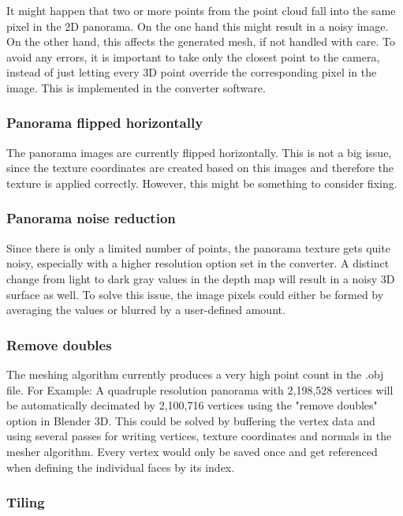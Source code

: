 It might happen that two or more points from the point cloud fall into the same pixel in the 2D panorama. On the one hand this might result in a noisy image. On the other hand, this affects the generated mesh, if not handled with care. To avoid any errors, it is important to take only the closest point to the camera, instead of just letting every 3D point override the corresponding pixel in the image. This is implemented in the converter software.

\subsubsection{Panorama flipped horizontally}

The panorama images are currently flipped horizontally. This is not a big issue, since the texture coordinates are created based on this images and therefore the texture is applied correctly. However, this might be something to consider fixing.

\subsubsection{Panorama noise reduction}

Since there is only a limited number of points, the panorama texture gets quite noisy, especially with a higher resolution option set in the converter. A distinct change from light to dark gray values in the depth map will result in a noisy 3D surface as well.
To solve this issue, the image pixels could either be formed by averaging the values or blurred by a user-defined amount.

\subsubsection{Remove doubles}

The meshing algorithm currently produces a very high point count in the .obj file. For Example: A quadruple resolution panorama with 2,198,528 vertices will be automatically decimated by 2,100,716 vertices using the "remove doubles" option in Blender 3D.
This could be solved by buffering the vertex data and using several passes for writing vertices, texture coordinates and normals in the mesher algorithm. Every vertex would only be saved once and get referenced when defining the individual faces by its index.

\subsubsection{Tiling}

